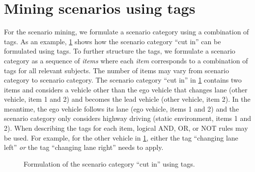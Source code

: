 \section{Mining scenarios using tags}
\label{sec:mining}

\cstartd
For the scenario mining, we formulate a scenario category using a combination of tags.
As an example, \cref{fig:cutin formulation tags} shows how the scenario category ``cut in'' can be formulated using tags.
To further structure the tags, we formulate a scenario category as a sequence of \emph{items} where each \emph{item} corresponds to a combination of tags for all relevant subjects.
The number of items may vary from scenario category to scenario category.
The scenario category ``cut in'' in \cref{fig:cutin formulation tags} contains two items and considers a vehicle other than the ego vehicle that changes lane (other vehicle, item 1 and 2) and becomes the lead vehicle (other vehicle, item 2).
In the meantime, the ego vehicle follows its lane (ego vehicle, items 1 and 2) and the scenario category only considers highway driving (static environment, items 1 and 2).
When describing the tags for each item, logical AND, OR, or NOT rules may be used. 
For example, for the other vehicle in \cref{fig:cutin formulation tags}, either the tag ``changing lane left'' \emph{or} the tag ``changing lane right'' needs to apply.
\cendd

\begin{figure}
	\centering
	
	\caption{\cstartd Formulation of the scenario category ``cut in'' using tags.\cendd}
	\label{fig:cutin formulation tags}
\end{figure}


